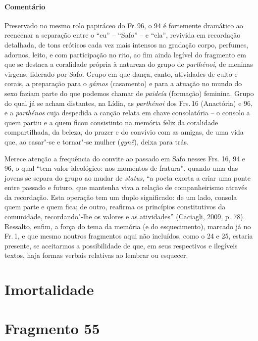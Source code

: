 {\paragraph{Comentário} Preservado no mesmo rolo papiráceo do Fr.\,96, o 94 é fortemente dramático ao
reencenar a separação entre o “eu” -- ``Safo” -- e “ela”, revivida em
recordação detalhada, de tons eróticos cada vez mais intensos na
gradação corpo, perfumes, adornos, leito, e com participação no rito,
ao fim ainda legível do fragmento em que se destaca a coralidade própria à natureza do grupo de \textit{parthénoi}, de meninas virgens, liderado por Safo. Grupo em que dança, canto, atividades de culto e corais, a preparação para o \textit{gámos} (casamento) e para a atuação no mundo do sexo faziam parte do que podemos chamar de \textit{paideía} (formação) feminina. Grupo do qual já se acham distantes, na Lídia, as \textit{parthénoi} dos Frs.\,16 (Anactória) e 96, e a \textit{parthénos} cuja despedida a canção relata em chave consolatória -- o consolo a quem partiu e a quem ficou consistinto na memória feliz da coralidade compartilhada, da beleza, do prazer e do convívio com as amigas, de uma vida que, ao casar"-se e tornar"-se mulher (\textit{gynḗ}), deixa para trás.

Merece atenção a frequência do convite ao passado em Safo nesses Frs. 16, 94 e 96, o qual “tem valor ideológico: nos momentos de fratura”, quando uma das jovens se separa do grupo ao mudar de \textit{status}, “a poeta exorta a criar uma ponte entre passado e futuro, que mantenha viva a relação de companheirismo através da recordação. Esta operação tem um duplo significado: de um lado, consola quem parte e quem fica; de outro, reafirma os princípios constitutivos da comunidade, recordando"-lhe os valores e as atividades” (Caciagli, 2009, p. 78).
Ressalto, enfim, a força do tema da memória (e do esquecimento), marcado já no Fr.\,1, e que mesmo noutros fragmentos aqui não incluídos, como o 24 e 25, estaria presente, se aceitarmos a possibilidade de que, em seus respectivos e ilegíveis textos, haja formas verbais relativas ao lembrar ou esquecer.
}





\pagebreak
\section{Imortalidade}
\section{Fragmento 55}

